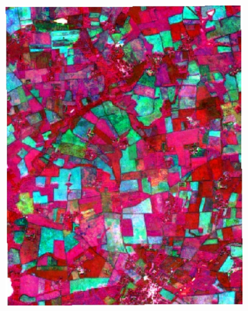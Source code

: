 \documentclass[journal,article,submit,pdftex,moreauthors]{Definitions/mdpi}
\providecommand{\DIFaddbeginFL}{} %
\providecommand{\DIFaddendFL}{} %
\providecommand{\DIFdelbeginFL}{} %
\providecommand{\DIFdelendFL}{} %
\begin{document}
\begin{figure}[H]
\begin{subfigure}[t]{0.23\linewidth}
\DIFdelendFL \DIFaddbeginFL \includegraphics[width=0.95\linewidth]{figures/aes_1_layer_mse_results/composites/composite_image_201032.pdf}
    \DIFaddendFL \caption{}
	\label{fig:color_map_f}
	\end{subfigure}
    \begin{subfigure}[t]{0.23\linewidth}
		\centering
	\DIFdelbeginFL %

\end{subfigure}
\end{figure}
\end{document}
